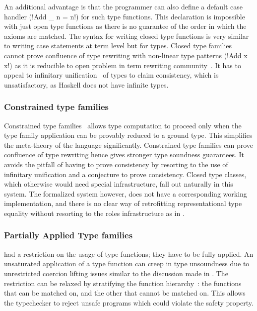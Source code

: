 \documentclass[screen,nonacm,manuscript,review]{acmart} %
\begin{document}
An additional advantage is that the programmer can also define a default case handler (!Add _ n = n!) for such type functions. This declaration is impossible with just open type functions as there is no guarantee of the order in which the axioms are matched. The syntax for writing closed type functions is very similar to writing case statements at term level but for types. Closed type families cannot prove confluence of type rewriting with non-linear type patterns (!Add x x!) as it is reducible to open problem in term rewriting community~\cite{mizuhito_rta_1995}. It has to appeal to infinitary unification~\cite{jaffar_efficient_1984} of types to claim consistency, which is unsatisfactory, as Haskell does not have infinite types.

\subsubsection{Constrained type families}
Constrained type families~\cite{morris_typefamilies_2017} allows type computation to proceed only when the type family application can be provably reduced to a ground type. This simplifies the meta-theory of the language significantly. Constrained type families can prove confluence of type rewriting hence gives stronger type soundness guarantees. It avoids the pitfall of having to prove consistency by resorting to the use of infinitary unification and a conjecture to prove consistency. Closed type classes, which otherwise would need special infrastructure, fall out naturally in this system. The formalized system however, does not have a corresponding  working implementation, and there is no clear way of retrofitting representational type equality without resorting to the roles infrastructure as in \SFR.

\subsubsection{Partially Applied Type families}
\SFC had a restriction on the usage of type functions; they have to
be fully applied. An unsaturated application of a type function can
creep in type unsoundness due to unrestricted coercion lifting issues
similar to the discussion made in \SFP. The restriction can be
relaxed by stratifying the function
hierarchy~\cite{kiss_higher-order_2019}: the functions that can be
matched on, and the other that cannot be matched on. This allows the
typechecker to reject unsafe programs which could violate the
safety property.
\end{document}

